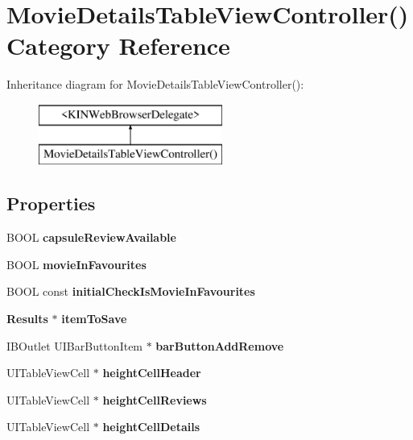 \section{Movie\+Details\+Table\+View\+Controller() Category Reference}
\label{category_movie_details_table_view_controller_07_08}
Inheritance diagram for Movie\+Details\+Table\+View\+Controller()\+:\begin{figure}[H]
\begin{center}
\leavevmode
\includegraphics[height=2.000000cm]{category_movie_details_table_view_controller_07_08}
\end{center}
\end{figure}
\subsection*{Properties}
\begin{DoxyCompactItemize}
\item 
B\+O\+O\+L {\bfseries capsule\+Review\+Available}\label{category_movie_details_table_view_controller_07_08_a4ed182aa1d34a26f6339f5b94fdce9e3}

\item 
B\+O\+O\+L {\bfseries movie\+In\+Favourites}\label{category_movie_details_table_view_controller_07_08_a75cd4c3761b61f8358375813ed60df73}

\item 
B\+O\+O\+L const {\bfseries initial\+Check\+Is\+Movie\+In\+Favourites}\label{category_movie_details_table_view_controller_07_08_a910b85bcc5253f445e18041ec5456573}

\item 
{\bf Results} $\ast$ {\bfseries item\+To\+Save}\label{category_movie_details_table_view_controller_07_08_ab734af72b11d45d349780adf8d71311d}

\item 
I\+B\+Outlet U\+I\+Bar\+Button\+Item $\ast$ {\bfseries bar\+Button\+Add\+Remove}\label{category_movie_details_table_view_controller_07_08_a886fde4b5068f34e03b62c13488b3123}

\item 
U\+I\+Table\+View\+Cell $\ast$ {\bfseries height\+Cell\+Header}\label{category_movie_details_table_view_controller_07_08_a411e2c6e55f83a36ccf7cf71651b5da0}

\item 
U\+I\+Table\+View\+Cell $\ast$ {\bfseries height\+Cell\+Reviews}\label{category_movie_details_table_view_controller_07_08_a8a6c6384d7f4e8483570e2b5d2a11da2}

\item 
U\+I\+Table\+View\+Cell $\ast$ {\bfseries height\+Cell\+Details}\label{category_movie_details_table_view_controller_07_08_a6c70a245e4b3acae916e1cfc4af20968}

\end{DoxyCompactItemize}


